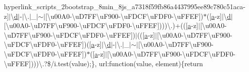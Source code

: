 \begin{DoxyCompactItemize}
hyperlink{_scripts_2bootstrap_8min_8js_a7318f59fb86a4437995ee89c780c51ac}{a}-\/z\mbox{]}$\vert$\textbackslash{}\hyperlink{_scripts_2respond_8min_8js_aeb337d295abaddb5ec3cb34cc2e2bbc9}{d}$\vert$-\/$\vert$\textbackslash{}.$\vert$\+\_\+$\vert$$\sim$$\vert$\mbox{[}\textbackslash{}u00\+A0-\/\textbackslash{}u\+D7\+F\+F\textbackslash{}u\+F900-\/\textbackslash{}u\+F\+D\+C\+F\textbackslash{}u\+F\+D\+F0-\/\textbackslash{}u\+F\+F\+EF\mbox{]})$\ast$(\mbox{[}\hyperlink{_scripts_2bootstrap_8min_8js_a7318f59fb86a4437995ee89c780c51ac}{a}-\/z\mbox{]}$\vert$\textbackslash{}\hyperlink{_scripts_2respond_8min_8js_aeb337d295abaddb5ec3cb34cc2e2bbc9}{d}$\vert$\mbox{[}\textbackslash{}u00\+A0-\/\textbackslash{}u\+D7\+F\+F\textbackslash{}u\+F900-\/\textbackslash{}u\+F\+D\+C\+F\textbackslash{}u\+F\+D\+F0-\/\textbackslash{}u\+F\+F\+EF\mbox{]})))\textbackslash{}.)+((\mbox{[}\hyperlink{_scripts_2bootstrap_8min_8js_a7318f59fb86a4437995ee89c780c51ac}{a}-\/z\mbox{]}$\vert$\mbox{[}\textbackslash{}u00\+A0-\/\textbackslash{}u\+D7\+F\+F\textbackslash{}u\+F900-\/\textbackslash{}u\+F\+D\+C\+F\textbackslash{}u\+F\+D\+F0-\/\textbackslash{}u\+F\+F\+EF\mbox{]})$\vert$((\mbox{[}\hyperlink{_scripts_2bootstrap_8min_8js_a7318f59fb86a4437995ee89c780c51ac}{a}-\/z\mbox{]}$\vert$\mbox{[}\textbackslash{}u00\+A0-\/\textbackslash{}u\+D7\+F\+F\textbackslash{}u\+F900-\/\textbackslash{}u\+F\+D\+C\+F\textbackslash{}u\+F\+D\+F0-\/\textbackslash{}u\+F\+F\+EF\mbox{]})(\mbox{[}\hyperlink{_scripts_2bootstrap_8min_8js_a7318f59fb86a4437995ee89c780c51ac}{a}-\/z\mbox{]}$\vert$\textbackslash{}\hyperlink{_scripts_2respond_8min_8js_aeb337d295abaddb5ec3cb34cc2e2bbc9}{d}$\vert$-\/$\vert$\textbackslash{}.$\vert$\+\_\+$\vert$$\sim$$\vert$\mbox{[}\textbackslash{}u00\+A0-\/\textbackslash{}u\+D7\+F\+F\textbackslash{}u\+F900-\/\textbackslash{}u\+F\+D\+C\+F\textbackslash{}u\+F\+D\+F0-\/\textbackslash{}u\+F\+F\+EF\mbox{]})$\ast$(\mbox{[}\hyperlink{_scripts_2bootstrap_8min_8js_a7318f59fb86a4437995ee89c780c51ac}{a}-\/z\mbox{]}$\vert$\mbox{[}\textbackslash{}u00\+A0-\/\textbackslash{}u\+D7\+F\+F\textbackslash{}u\+F900-\/\textbackslash{}u\+F\+D\+C\+F\textbackslash{}u\+F\+D\+F0-\/\textbackslash{}u\+F\+F\+EF\mbox{]})))\textbackslash{}.?\$/i.\+test(value);\}, url\+:function(value, element)\{return 
\end{DoxyCompactItemize}
